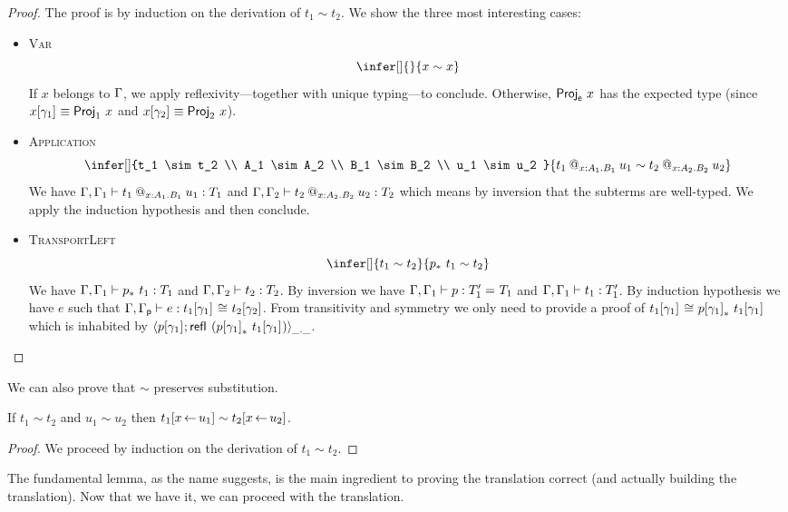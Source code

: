 \begin{proof}
  The proof is by induction on the derivation of $t_1 \sim t_2$. We show
  the three most interesting cases:

  \begin{itemize}
  \item \textsc{Var}
    \[
      \infer[]
        { }
        {x \sim x}
    \]
    If $x$ belongs to $\Ga$, we apply reflexivity---together with unique
    typing---to conclude.
    Otherwise, $\ProjE{x}$ has the expected type (since
    $\llift{\gamma}{}{x} \equiv \ProjO{x}$ and $\rlift{\gamma}{}{x} \equiv \ProjT{x}$).

  \item \textsc{Application}
    \[
      \infer[]
        {t_1 \sim t_2 \\
         A_1 \sim A_2 \\
         B_1 \sim B_2 \\
         u_1 \sim u_2
        }
        {\app{t_1}{x:A_1}{B_1}{u_1} \sim \app{t_2}{x:A_2}{B_2}{u_2}}
    \]
    We have $\isterm{\Ga, \Ga_1}{\app{t_1}{x:A_1}{B_1}{u_1}}{T_1}$ and
    $\isterm{\Ga, \Ga_2}{\app{t_2}{x:A_2}{B_2}{u_2}}{T_2}$ which means by
    inversion that the subterms are well-typed.
    We apply the induction hypothesis and then conclude.
  \item \textsc{TransportLeft}
    \[
      \infer[]
        {t_1 \sim t_2}
        {\transpo{p}\ t_1 \sim t_2}
    \]
    We have $\isterm{\Ga, \Ga_1}{\transpo{p}\ t_1}{T_1}$ and
    $\isterm{\Ga, \Ga_2}{t_2}{T_2}$.
    By inversion we have
    $\isterm{\Ga, \Ga_1}{p}{\Eq{}{T_1'}{T_1}}$ and
    $\isterm{\Ga, \Ga_1}{t_1}{T_1'}$.
    By induction hypothesis we have $e$ such that
    $\isterm{\Ga, \Gp}{e}{\Heq{}{\llift{\gamma}{}{t_1}}{}{\rlift{\gamma}{}{t_2}}}$.
    From transitivity and symmetry we only need to provide a proof of
    $\Heq{}{\llift{\gamma}{}{t_1}}{}{\transpo{\llift{\gamma}{}{p}}\ \llift{\gamma}{}{t_1}}$ which is inhabited by
    $\pair{\_}{\_}{\llift{\gamma}{}{p}}{\refl{} (\transpo{\llift{\gamma}{}{p}}\ \llift{\gamma}{}{t_1})}$.
  \end{itemize}
\end{proof}

We can also prove that $\sim$ preserves substitution.

\begin{lemma}
  If $t_1 \sim t_2$ and $u_1 \sim u_2$ then
  $t_1[x \sto u_1] \sim t_2[x \sto u_2]$.
\end{lemma}

\begin{proof}
  We proceed by induction on the derivation of $t_1 \sim t_2$.
\end{proof}

The fundamental lemma, as the name suggests, is the main ingredient to proving
the translation correct (and actually building the translation). Now that we
have it, we can proceed with the translation.